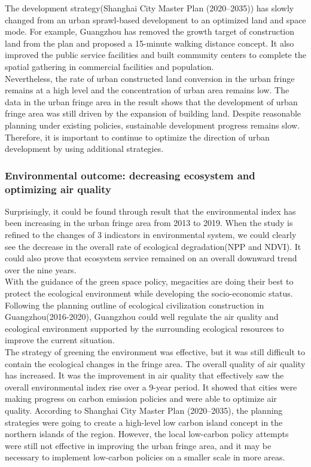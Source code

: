 The development strategy(Shanghai City Master Plan (2020–2035)) has slowly changed from an urban sprawl-based development to an optimized land and space mode. For example, Guangzhou has removed the growth target of construction land from the plan and proposed a 15-minute walking distance concept. It also improved the public service facilities and built community centers to complete the spatial gathering in commercial facilities and population.\\

Nevertheless, the rate of urban constructed land conversion in the urban fringe remains at a high level and the concentration of urban area remains low. The data in the urban fringe area in the result shows that the development of urban fringe area was still driven by the expansion of building land. Despite reasonable planning under existing policies, sustainable development progress remains slow. Therefore, it is important to continue to optimize the direction of urban development by using additional strategies.\\


\subsubsection{Environmental outcome: decreasing ecosystem and optimizing air quality}
Surprisingly, it could be found through result that the environmental index has been increasing in the urban fringe area from 2013 to 2019. When the study is refined to the changes of 3 indicators in environmental system, we could clearly see the decrease in the overall rate of ecological degradation(NPP and NDVI). It could also prove that ecosystem service remained on an overall downward trend over the nine years. \\

With the guidance of the green space policy, megacities are doing their best to protect the ecological environment while developing the socio-economic status. Following the planning outline of ecological civilization construction in Guangzhou(2016-2020), Guangzhou could well regulate the air quality and ecological environment supported by the surrounding ecological resources to improve the current situation.\\

The strategy of greening the environment was effective, but it was still difficult to contain the ecological changes in the fringe area. The overall quality of air quality has increased. It was the improvement in air quality that effectively saw the overall environmental index rise over a 9-year period. It showed that cities were making progress on carbon emission policies and were able to optimize air quality. According to Shanghai City Master Plan (2020–2035), the planning strategies were going to create a high-level low carbon island concept in the northern islands of the region. However, the local low-carbon policy attempts were still not effective in improving the urban fringe area, and it may be necessary to implement low-carbon policies on a smaller scale in more areas.\\

